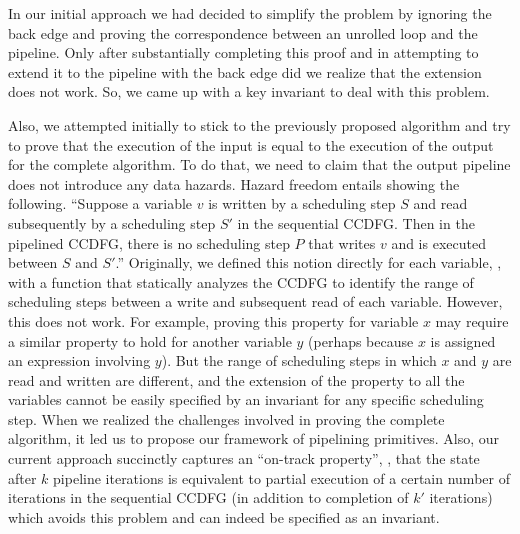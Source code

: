 In our initial approach we had decided to simplify the problem
by ignoring the back edge and proving the correspondence
between an unrolled loop and the pipeline.
Only after substantially completing this proof and in
attempting to extend it to the pipeline with the back edge
did we realize that the extension does not work. So, we came up with a key
invariant to deal with this problem.

Also, we attempted initially to stick to the previously proposed algorithm
and try to prove that the execution of the input is equal to the execution
of the output for the complete algorithm. To do that, we need to claim that
the output pipeline does not introduce any data hazards.
Hazard freedom entails showing the
following. ``Suppose a variable $v$ is written by a
scheduling step $S$ and read subsequently by a scheduling
step $S'$ in the sequential CCDFG.  Then in the pipelined
CCDFG, there is no scheduling step $P$ that writes $v$ and
is executed between $S$ and $S'$.''  Originally, we defined
this notion directly for each variable, \viz, with a
function that statically analyzes the CCDFG to identify the
range of scheduling steps between a write and subsequent
read of each variable.  However, this does not
work.  For example, proving this property for variable $x$
may require a similar property to hold for another variable
$y$ (perhaps because $x$ is assigned an expression involving
$y$).  But the range of scheduling steps in which $x$ and
$y$ are read and written are different, and the extension of
the property to all the variables cannot be easily specified
by an invariant for any specific scheduling step. When we realized
the challenges involved in proving the complete algorithm,
it led us to propose our framework of pipelining primitives.
Also, our current approach succinctly captures an ``on-track property'',
\viz, that the
state after $k$ pipeline iterations is equivalent to partial
execution of a certain number of iterations in the
sequential CCDFG (in addition to completion of $k'$
iterations) which avoids this problem and can indeed be
specified as an invariant.

